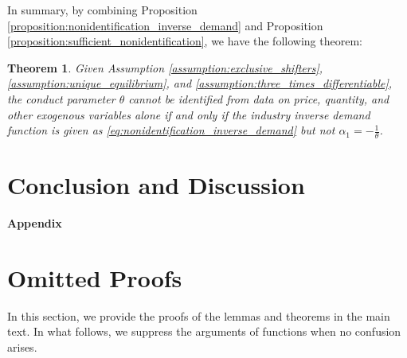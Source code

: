\documentclass[11pt, a4paper]{article}
\newtheorem{theorem}{Theorem}
\theoremstyle{remark}
\newcommand{\appendixsection}{%
  \setcounter{section}{0}%
  \renewcommand{\thesection}{\Alph{section}}%
  \renewcommand{\thetheorem}{\Alph{section}.\arabic{theorem}}%
  \renewcommand{\thelemma}{\Alph{section}.\arabic{lemma}}%
  \renewcommand{\theproposition}{\Alph{section}.\arabic{proposition}}%
  \renewcommand{\thecorollary}{\Alph{section}.\arabic{corollary}}%
  \renewcommand{\thedefinition}{\Alph{section}.\arabic{definition}}%
}
\begin{document}
In summary, by combining Proposition \ref{proposition:nonidentification_inverse_demand} and Proposition \ref{proposition:sufficient_nonidentification}, we have the following theorem:
\begin{theorem}\label{theorem:identification_characterization}
    Given Assumption \ref{assumption:exclusive_shifters}, \ref{assumption:unique_equilibrium}, and \ref{assumption:three_times_differentiable}, the conduct parameter $\theta$ cannot be identified from data on price, quantity, and other exogenous variables alone if and only if the industry inverse demand function is given as \eqref{eq:nonidentification_inverse_demand} but not $\alpha_1 = -\frac{1}{\theta}$.
\end{theorem}












\section{Conclusion and Discussion}






\newpage
\appendix
\appendixsection
{}

\begin{center}
\huge\textbf{Appendix}
\end{center}
\vspace{1mm}

\section{Omitted Proofs}\label{appendix:proof}
In this section, we provide the proofs of the lemmas and theorems in the main text.
In what follows, we suppress the arguments of functions when no confusion arises.
\end{document}
